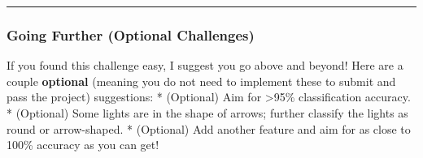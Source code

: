 \documentclass[11pt]{article}
\begin{document}
\begin{center}\rule{0.5\linewidth}{\linethickness}\end{center}

    \hypertarget{going-further-optional-challenges}{%
\subsubsection{Going Further (Optional
Challenges)}\label{going-further-optional-challenges}}

If you found this challenge easy, I suggest you go above and beyond!
Here are a couple \textbf{optional} (meaning you do not need to
implement these to submit and pass the project) suggestions: *
(Optional) Aim for \textgreater{}95\% classification accuracy. *
(Optional) Some lights are in the shape of arrows; further classify the
lights as round or arrow-shaped. * (Optional) Add another feature and
aim for as close to 100\% accuracy as you can get!


    
    
    
    
\end{document}
